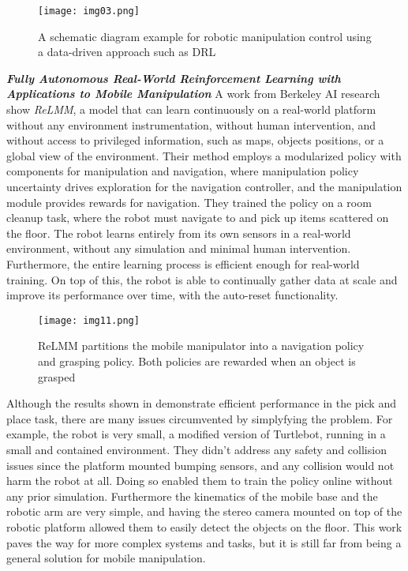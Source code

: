 \begin{figure}[H]
	\centering
	\texttt{[image: img03.png]}
	\captionsetup{width=0.8\linewidth}
	\caption{A schematic diagram example for robotic manipulation control
		using a data-driven approach such as DRL \cite{liu2021deep}}
	\label{fig:img03}
\end{figure}

\textbf{\textit{Fully Autonomous Real-World Reinforcement
Learning with Applications to Mobile Manipulation}} \quad
A work from Berkeley AI research \cite{sun2022relmm} show \textit{ReLMM}, a model that
can learn continuously on a real-world platform without any environment instrumentation,
without human intervention, and without access to privileged information, such as maps,
objects positions, or a global view of the environment. Their method employs a
modularized policy with components for manipulation and navigation, where manipulation
policy uncertainty drives exploration for the navigation controller, and the manipulation
module provides rewards for navigation. They trained the policy on a room cleanup task, where
the robot must navigate to and pick up items scattered on the floor.
The robot learns entirely from its own sensors in a real-world environment, without any
simulation and minimal human intervention. Furthermore, the entire learning process is efficient
enough for real-world training. On top of this, the robot is able to continually gather data
at scale and improve its performance over time, with the auto-reset functionality.

\begin{figure}[H]
	\centering
	\texttt{[image: img11.png]}
	\captionsetup{width=1\linewidth}
	\caption{ReLMM partitions the mobile manipulator into a navigation policy
	and grasping policy. Both policies are rewarded when an object is grasped
		\cite{sun2022relmm}}
	\label{fig:img11}
\end{figure}

Although the results shown in \cite{sun2022relmm} demonstrate efficient performance in
the pick and place task, there are many issues circumvented by simplyfying the problem.
For example, the robot is very small, a modified version of Turtlebot, running in a small and
contained environment. They didn't address any safety and collision issues since the platform
mounted bumping sensors, and any collision would not harm the robot at all. Doing so enabled them
to train the policy online without any prior simulation.
Furthermore the kinematics of the mobile base and the robotic arm are very simple, and having the
stereo camera mounted on top of the robotic platform allowed them to easily detect the objects
on the floor. This work paves the way for more complex systems and tasks, but it is still far
from being a general solution for mobile manipulation.

